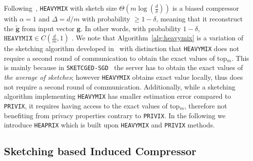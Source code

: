\documentclass{article} %
\newtheorem{lemma}{Lemma}
\begin{document}
Following~\cite{ivkin2019communication}, \texttt{HEAVYMIX} with sketch size $\Theta\left(m\log\left(\frac{d}{\delta}\right)\right)$ is a biased compressor with $\alpha=1$ and  $\Delta=d/m$ with probability $\geq1-\delta$, meaning that it reconstruct the $\tilde{\mathbf{g}}$ from input vector $\mathbf{g}$. In other words, with probability $1-\delta$, $\texttt{HEAVYMIX}\in C(\frac{d}{m},1)$ . 
We note that Algorithm~\ref{alg:heavymix} is a variation of the sketching algorithm developed in~\cite{ivkin2019communication} with distinction that \texttt{HEAVYMIX} does not require a second round of communication to obtain the exact values of top$_m$.
This is mainly because in \texttt{SKETCGED-SGD}~\cite{ivkin2019communication} the server has to obtain the exact values of \emph{the average of sketches}; however \texttt{HEAVYMIX} obtains exact value locally, thus does not require a second round of communication.
Additionally, while a sketching algorithm implementing \texttt{HEAVYMIX} has smaller estimation error compared to \texttt{PRIVIX}, it requires having access to the exact values of top$_m$, therefore not benefiting from privacy properties contrary to \texttt{PRIVIX}. 
In the following we introduce \texttt{HEAPRIX} which is built upon \texttt{HEAVYMIX} and \texttt{PRIVIX} methods.

\vspace{-0.05in}
\subsection{Sketching based Induced Compressor}
\vspace{-0.05in}
\end{document}
